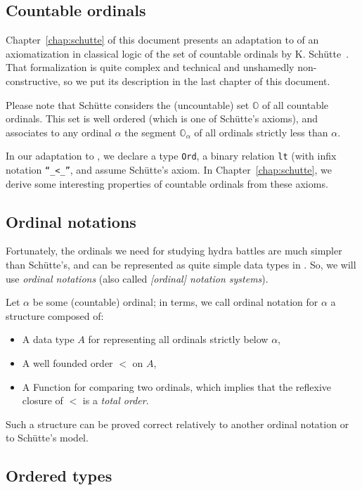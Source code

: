 \subsection{Countable ordinals}

Chapter~\ref{chap:schutte} of this document presents an adaptation to \coq{} of an axiomatization in classical logic of the set of countable ordinals by K. Schütte~\cite{schutte}. 
That formalization is quite complex and technical and unshamedly non-constructive,  so we put its description  in the last chapter of this document. 

Please note that Schütte considers the (uncountable) set $\mathbb{O}$ of all countable ordinals. This set is well ordered (which is one of Schütte's axioms), and associates to any ordinal $\alpha$ the segment $\mathbb{O}_\alpha$ of all ordinals strictly less than $\alpha$.

In our adaptation to \coq{}, we declare a type \texttt{Ord}, a binary relation \texttt{lt} (with infix notation \texttt{``\_<\_''}, and assume Schütte's axiom. In Chapter~\ref{chap:schutte},
we derive some interesting properties of countable ordinals from these axioms.


\subsection{Ordinal notations}


Fortunately, the ordinals we need for  studying hydra battles are much simpler than Schütte's, and can be represented as quite simple data types in \gallina. So, we will use \emph{ordinal notations} (also called \emph{[ordinal] notation systems}). 

Let $\alpha$ be some (countable) ordinal; 
in \coq{} terms, we call ordinal notation for $\alpha$ a structure composed 
of:
\begin{itemize}
\item A data type $A$ for representing all ordinals strictly below $\alpha$,
\item A well founded order $<$ on $A$, 
\item A Function for comparing two ordinals, which implies that the reflexive closure of $<$ is a \emph{total order}.
\end{itemize}


Such a structure can be proved correct relatively to another ordinal notation or
to Schütte's model.




\subsection{Ordered types}

